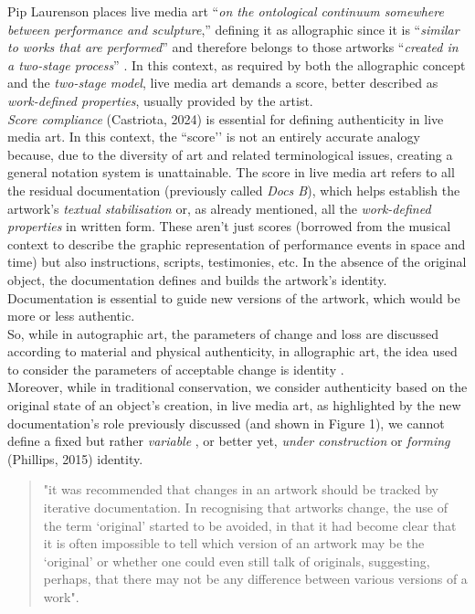 Pip Laurenson places live media art ``\textit{on the ontological continuum somewhere between performance and sculpture},'' defining it as allographic since it is ``\textit{similar to works that are performed}'' and therefore belongs to those artworks ``\textit{created in a two-stage process}'' \cite{laurenson2006authenticity}. In this context, as required by both the allographic concept and the \textit{two-stage model}, live media art demands a score, better described as \textit{work-defined properties}, usually provided by the artist.\\
\textit{Score compliance} (Castriota, 2024) is essential for defining authenticity in live media art. In this context, the ``score’’ is not an entirely accurate analogy because, due to the diversity of art and related terminological issues, creating a general notation system is unattainable. The score in live media art refers to all the residual documentation (previously called \textit{Docs B}), which helps establish the artwork's \textit{textual stabilisation} \cite{holling2016aesthetics} or, as already mentioned, all the \textit{work-defined properties} in written form. These aren’t just scores (borrowed from the musical context to describe the graphic representation of performance events in space and time) but also instructions, scripts, testimonies, etc. In the absence of the original object, the documentation defines and builds the artwork's identity. Documentation is essential to guide new versions of the artwork, which would be more or less authentic.\\
So, while in autographic art, the parameters of change and loss are discussed according to material and physical authenticity, in allographic art, the idea used to consider the parameters of acceptable change is identity \cite{laurenson2006authenticity}.\\
Moreover, while in traditional conservation, we consider authenticity based on the original state of an object's creation, in live media art, as highlighted by the new documentation's role previously discussed (and shown in Figure 1), we cannot define a fixed but rather \textit{variable} \cite{groys2008art}, or better yet, \textit{under construction} \cite{dekker2022documentation} or \textit{forming} (Phillips, 2015) identity.
\begin{quote}
    "it was recommended that changes in an artwork should be tracked by iterative documentation. In recognising that artworks change, the use of the term ‘original’ started to be avoided, in that it had become clear that it is often impossible to tell which version of an artwork may be the ‘original’ or whether one could even still talk of originals, suggesting, perhaps, that there may not be any difference between various versions of a work". \cite{giannachi2022use}
\end{quote}
